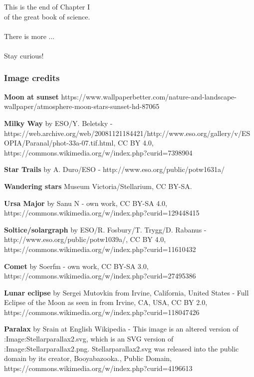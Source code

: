 \documentclass[aspectratio=169,xcolor=pdftex,dvipsnames]{beamer} %
\begin{document}
\begin{frame}

\pause
\Huge{
This is the end \pause 
of Chapter I\pause
\\
of the great book of science.\pause
\\ \ \\
There is more ...\pause
\\ \ \\
Stay curious!
}


\end{frame}

\begin{frame}
\frametitle{Image credits}

\tiny{

\textbf{Moon at sunset} https://www.wallpaperbetter.com/nature-and-landscape-wallpaper/atmosphere-moon-stars-sunset-hd-87065

\textbf{Milky Way} by ESO/Y. Beletsky - https://web.archive.org/web/20081121184421/http://www.eso.org/gallery/v/ESOPIA/Paranal/phot-33a-07.tif.html, CC BY 4.0, https://commons.wikimedia.org/w/index.php?curid=7398904

\textbf{Star Trails} by A. Duro/ESO - http://www.eso.org/public/potw1631a/

\textbf{Wandering stars} Museum Victoria/Stellarium, CC BY-SA.

\textbf{Ursa Major} by Sanu N - own work, CC BY-SA 4.0, https://commons.wikimedia.org/w/index.php?curid=129448415

\textbf{Soltice/solargraph} by ESO/R. Fosbury/T. Trygg/D. Rabanus - http://www.eso.org/public/potw1039a/, CC BY 4.0, https://commons.wikimedia.org/w/index.php?curid=11610432

\textbf{Comet} by Soerfm - own work, CC BY-SA 3.0, https://commons.wikimedia.org/w/index.php?curid=27495386

\textbf{Lunar eclipse} by Sergei Mutovkin from Irvine, California, United States - Full Eclipse of the Moon as seen in from Irvine, CA, USA, CC BY 2.0, https://commons.wikimedia.org/w/index.php?curid=118047426

\textbf{Paralax} by Srain at English Wikipedia - This image is an altered version of :Image:Stellarparallax2.svg, which is an SVG version of :Image:Stellarparallax2.png. Stellarparallax2.svg was released into the public domain by its creator, Booyabazooka., Public Domain, https://commons.wikimedia.org/w/index.php?curid=4196613

}
\end{frame}
\end{document}
